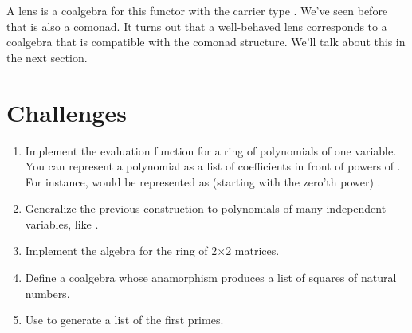 A lens is a coalgebra for this functor with the carrier type .
We've seen before that  is also a comonad. It turns out
that a well-behaved lens corresponds to a coalgebra that is compatible
with the comonad structure. We'll talk about this in the next section.

\section{Challenges}\label{challenges}

\begin{enumerate}
\tightlist
\item
  Implement the evaluation function for a ring of polynomials of one
  variable. You can represent a polynomial as a list of coefficients in
  front of powers of . For instance,  would be
  represented as (starting with the zero'th power)
  \code{{[}-1, 0, 4{]}}.
\item
  Generalize the previous construction to polynomials of many
  independent variables, like .
\item
  Implement the algebra for the ring of 2×2 matrices.
\item
  Define a coalgebra whose anamorphism produces a list of squares of
  natural numbers.
\item
  Use  to generate a list of the first 
  primes.
\end{enumerate}